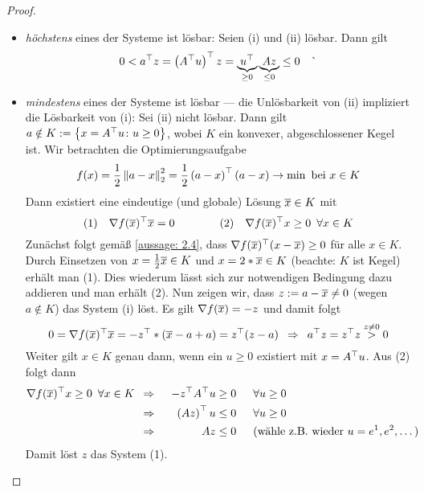 \begin{proof}
	\begin{itemize}[leftmargin=*, nolistsep]
		\item \textit{höchstens} eines der Systeme ist lösbar: Seien (i) und (ii) lösbar. Dann gilt
		\begin{equation*}
			0 < a^{\top} z = \left( A^{\top}u \right)^{\top} z = \underbrace{u^{\top}}_{\ge 0} \underbrace{A z}_{\le 0} \le 0 \quad \lightning
		\end{equation*}
		\item  \textit{mindestens} eines der Systeme ist lösbar --- die Unlösbarkeit von (ii) impliziert die Lösbarkeit von (i):  Sei (ii) nicht lösbar. Dann gilt
		$a \notin K \mathrel{:=} \left\{ x = A^{\top} u \colon u \ge 0 \right\}$, wobei $K$ ein konvexer, abgeschlossener Kegel ist. Wir betrachten die Optimierungsaufgabe
		\begin{equation*}
			f(x) = \frac{1}{2} \left\lVert a-x \right\rVert_2^2 = \frac{1}{2} \left( a-x \right)^{\top}(a-x) \to \min \text{ bei } x \in K
		\end{equation*}
		Dann existiert eine eindeutige (und globale) Lösung $\overline{x} \in K$ mit
		\begin{equation*}
			(1) \quad \nabla f(\overline{x})^{\top} \overline{x} = 0 
			\qquad \qquad 
			(2) \quad \nabla f(\overline{x})^{\top} x \ge 0 \enskip \forall x \in K
		\end{equation*}
		Zunächst folgt gemäß \cref{aussage: 2.4}, dass $\nabla f(\overline{x})^{\top} (x - \overline{x}) \ge 0$ für alle $x \in K$. Durch Einsetzen von $x = \frac{1}{2} \overline{x} \in K$ und $x = 2*\overline{x} \in K$ (beachte: $K$ ist Kegel) erhält man (1). Dies wiederum lässt sich zur notwendigen Bedingung dazu addieren und man erhält (2). 
		Nun zeigen wir, dass $z \mathrel{:=} a - \overline{x} \neq 0$ (wegen $a \notin K$) das System (i) löst. Es gilt $\nabla f(\overline{x}) = -z$ und damit folgt
		\begin{equation*}
			0 = \nabla f(\overline{x})^{\top} \overline{x} = -z^{\top} * (\overline{x} - a + a) = z^{\top} (z-a)  \enskip \Rightarrow \enskip a^{\top} z = z^{\top} z \overset{z \neq 0}{>} 0
		\end{equation*}
		Weiter gilt $x \in K$ genau dann, wenn ein $u \ge 0$ existiert mit $x = A^{\top} u$. Aus (2) folgt dann 
		\begin{equation*}
			\begin{aligned}
			\nabla f(\overline{x})^{\top} x \ge 0 \enskip \forall x \in K &\enskip \Rightarrow \enskip& - z^{\top} A^{\top} u &\ge 0 \enskip &&\forall u \ge 0 \\
			&\enskip \Rightarrow \enskip& \left( Az \right)^{\top} u &\le 0 \enskip &&\forall u \ge 0 \\
			&\enskip \Rightarrow \enskip& Az &\le 0 && (\text{wähle z.B. wieder } u = e^1, e^2, \dots)
			\end{aligned}
		\end{equation*}
		Damit löst $z$ das System (1).
	\end{itemize}
\end{proof}

